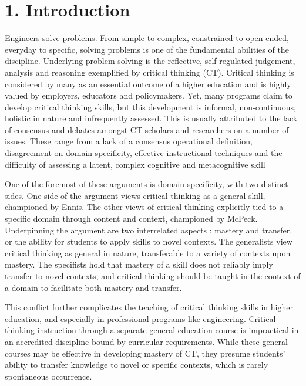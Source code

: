 \section{1. Introduction}



Engineers solve problems.  From simple to complex, constrained to open-ended, everyday to specific, solving problems is one of the fundamental abilities of the discipline.  Underlying problem solving is the reflective, self-regulated judgement, analysis and reasoning exemplified by critical thinking (CT).  Critical thinking is considered by many as an essential outcome of a higher education and is highly valued by employers, educators and policymakers.  Yet, many  programs claim to develop critical thinking skills, but this development is informal, non-continuous, holistic in nature and infrequently assessed\cite{Paul:1997ti,Ahern:2012ey}.  This is usually attributed to the lack of consensus and debates amongst CT scholars and researchers on a number of issues.  These range from a lack of a consensus operational definition, disagreement on domain-specificity\cite{Ennis:1989bm,McPeck:1990is}, effective instructional techniques\cite{Tsui:2002cc} and the difficulty of assessing a latent, complex cognitive and metacognitive skill\cite{Ennis:1993us,Halpern:2003tt}
 
One of the foremost of these arguments is domain-specificity, with two distinct sides.  One side of the argument views critical thinking as a general skill, championed by Ennis\cite{Ennis:1989bm}.  The other views of critical thinking explicitly tied to a specific domain through content and context, championed by McPeck\cite{McPeck:1990is}.  Underpinning the argument are two interrelated aspects : mastery and transfer, or the ability for students to apply skills to novel contexts. The generalists view critical thinking as general in nature, transferable to a variety of contexts upon mastery.  The specifists hold that mastery of a skill does not reliably imply transfer to novel contexts, and critical thinking should be taught in the context of a domain to facilitate both mastery and transfer.  

This conflict further complicates the teaching of critical thinking skills in higher education, and especially in professional programs like engineering.  Critical thinking instruction through a separate general education course is impractical in an accredited discipline bound by curricular requirements.  While these general courses may be effective in developing mastery of CT, they presume students’ ability to transfer knowledge to novel or specific contexts, which is rarely spontaneous occurrence\cite{Abrami:2008td}.

